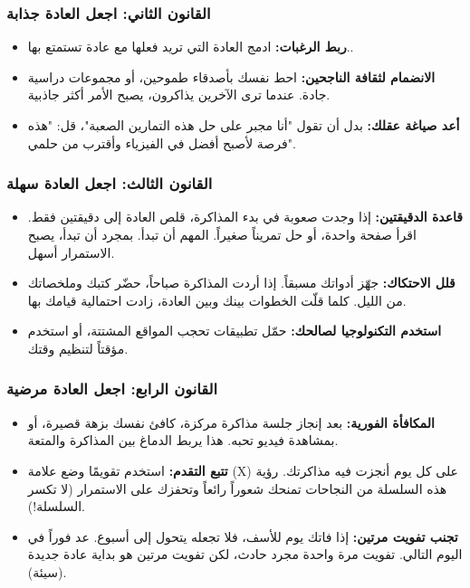 \documentclass[12pt,a4paper]{book}
\begin{document}
	\subsubsection{القانون الثاني: اجعل العادة جذابة }
	\begin{itemize}
		\item \textbf{ربط الرغبات:} ادمج العادة التي تريد فعلها مع عادة تستمتع بها..
		\item \textbf{الانضمام لثقافة الناجحين:} احط نفسك بأصدقاء طموحين، أو مجموعات دراسية جادة. عندما ترى الآخرين يذاكرون، يصبح الأمر أكثر جاذبية.
		\item \textbf{أعد صياغة عقلك:} بدل أن تقول "أنا مجبر على حل هذه التمارين الصعبة"، قل: "هذه فرصة لأصبح أفضل في الفيزياء وأقترب من حلمي".
	\end{itemize}
	
	\subsubsection{القانون الثالث: اجعل العادة سهلة }
	\begin{itemize}
		\item \textbf{قاعدة الدقيقتين:} إذا وجدت صعوبة في بدء المذاكرة، قلص العادة إلى دقيقتين فقط. اقرأ صفحة واحدة، أو حل تمريناً صغيراً. المهم أن تبدأ. بمجرد أن تبدأ، يصبح الاستمرار أسهل.
		\item \textbf{قلل الاحتكاك:} جهّز أدواتك مسبقاً. إذا أردت المذاكرة صباحاً، حضّر كتبك وملخصاتك من الليل. كلما قلّت الخطوات بينك وبين العادة، زادت احتمالية قيامك بها.
		\item \textbf{استخدم التكنولوجيا لصالحك:} حمّل تطبيقات تحجب المواقع المشتتة، أو استخدم مؤقتاً لتنظيم وقتك.
	\end{itemize}
	
	\subsubsection{القانون الرابع: اجعل العادة مرضية }
	\begin{itemize}
		\item \textbf{المكافأة الفورية:} بعد إنجاز جلسة مذاكرة مركزة، كافئ نفسك بزهة قصيرة، أو بمشاهدة فيديو تحبه. هذا يربط الدماغ بين المذاكرة والمتعة.
		\item \textbf{تتبع التقدم:} استخدم تقويمًا وضع علامة (X) على كل يوم أنجزت فيه مذاكرتك. رؤية هذه السلسلة من النجاحات تمنحك شعوراً رائعاً وتحفزك على الاستمرار (لا تكسر السلسلة!).
		\item \textbf{تجنب تفويت مرتين:} إذا فاتك يوم للأسف، فلا تجعله يتحول إلى أسبوع. عد فوراً في اليوم التالي. تفويت مرة واحدة مجرد حادث، لكن تفويت مرتين هو بداية عادة جديدة (سيئة).
	\end{itemize}
	
\end{document}
